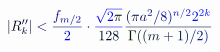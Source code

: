 \documentclass[12pt]{article}
\begin{document}
\makeatletter
\renewcommand*{\@textcolor}[3]{%
  \protect\leavevmode
  \begingroup
    \color#1{#2}#3%
  \endgroup
}
\makeatother
\begin{displaymath}
\mathcolor[RGB]{0,0,15}{|} \mathcolor[RGB]{0,0,30}{R} _ { \mathcolor[RGB]{0,0,45}{k} } ^ { \mathcolor[RGB]{0,0,60}{\prime} \mathcolor[RGB]{0,0,75}{\prime} } \mathcolor[RGB]{0,0,90}{|} \mathcolor[RGB]{0,0,105}{<} \mathcolor[RGB]{0,0,120}{\frac { \mathcolor[RGB]{0,0,135}{f} _ { \mathcolor[RGB]{0,0,150}{m} \mathcolor[RGB]{0,0,165}{/} \mathcolor[RGB]{0,0,180}{2} } } { \mathcolor[RGB]{0,0,195}{2} } } \mathcolor[RGB]{0,0,210}{\cdot} \mathcolor[RGB]{0,0,225}{\frac { \mathcolor[RGB]{0,0,240}{\sqrt { \mathcolor[RGB]{0,0,255}{2} \mathcolor[RGB]{0,15,0}{\pi} } } } { \mathcolor[RGB]{0,15,15}{1} \mathcolor[RGB]{0,15,30}{2} \mathcolor[RGB]{0,15,45}{8} } } \mathcolor[RGB]{0,15,60}{\frac { \mathcolor[RGB]{0,15,75}{(} \mathcolor[RGB]{0,15,90}{\pi} \mathcolor[RGB]{0,15,105}{a} ^ { \mathcolor[RGB]{0,15,120}{2} } \mathcolor[RGB]{0,15,135}{/} \mathcolor[RGB]{0,15,150}{8} \mathcolor[RGB]{0,15,165}{)} ^ { \mathcolor[RGB]{0,15,180}{n} \mathcolor[RGB]{0,15,195}{/} \mathcolor[RGB]{0,15,210}{2} } \mathcolor[RGB]{0,15,225}{2} ^ { \mathcolor[RGB]{0,15,240}{2} \mathcolor[RGB]{0,15,255}{k} } } { \mathcolor[RGB]{0,30,0}{\Gamma} \mathcolor[RGB]{0,30,15}{(} \mathcolor[RGB]{0,30,30}{(} \mathcolor[RGB]{0,30,45}{m} \mathcolor[RGB]{0,30,60}{+} \mathcolor[RGB]{0,30,75}{1} \mathcolor[RGB]{0,30,90}{)} \mathcolor[RGB]{0,30,105}{/} \mathcolor[RGB]{0,30,120}{2} \mathcolor[RGB]{0,30,135}{)} } }
\end{displaymath}
\end{document}

